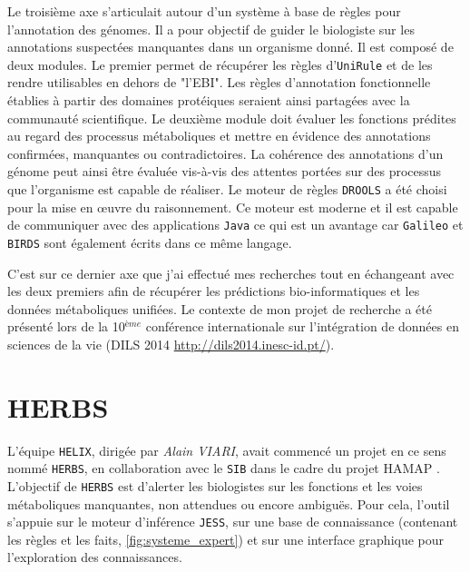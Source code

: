\begin{refsegment}
Le troisième axe s'articulait autour d'un système à base de règles pour l'annotation des génomes. Il a pour objectif de guider le biologiste sur les annotations suspectées manquantes dans un organisme donné. Il est composé de deux modules. Le premier permet de récupérer les règles d'\texttt{UniRule} et de les rendre utilisables en dehors de "l'\gls{EBI}". Les règles d'annotation fonctionnelle établies à partir des domaines protéiques seraient ainsi partagées avec la communauté scientifique. Le deuxième module doit évaluer les fonctions prédites au regard des processus métaboliques et mettre en évidence des annotations confirmées, manquantes ou contradictoires. La cohérence des annotations d'un génome peut ainsi être évaluée vis-à-vis des attentes portées sur des processus que l'organisme est capable de réaliser. Le moteur de règles \texttt{DROOLS} a été choisi pour la mise en œuvre du raisonnement. Ce moteur est moderne et il est capable de communiquer avec des applications  \texttt{Java} ce  qui est un avantage car \texttt{Galileo} et \texttt{BIRDS} sont également écrits dans ce même langage.

C'est sur ce dernier axe que j'ai effectué mes recherches tout en échangeant avec les deux premiers afin de récupérer les prédictions bio-informatiques et les données métaboliques unifiées. Le contexte de mon projet de recherche a été présenté lors de la 10$^{ème}$ conférence internationale sur l'intégration de données en sciences de la vie (DILS 2014 \url{http://dils2014.inesc-id.pt/}).



\section{HERBS}

L'équipe \texttt{HELIX}, dirigée par \textit{Alain VIARI}, avait commencé un projet en ce sens nommé \texttt{\gls{HERBS}}, en collaboration avec le \texttt{\gls{SIB}} dans le cadre du projet \gls{HAMAP} \cite{pedruzzi2015hamap}. L'objectif de \texttt{\gls{HERBS}} est d'alerter les biologistes sur les fonctions et les voies métaboliques manquantes, non attendues ou encore ambiguës. Pour cela, l'outil s'appuie sur le moteur d'inférence \texttt{\gls{JESS}}, sur une base de connaissance (contenant les règles et les faits, \cref{fig:systeme_expert}) et sur une interface graphique pour l'exploration des connaissances. 


\end{refsegment}
